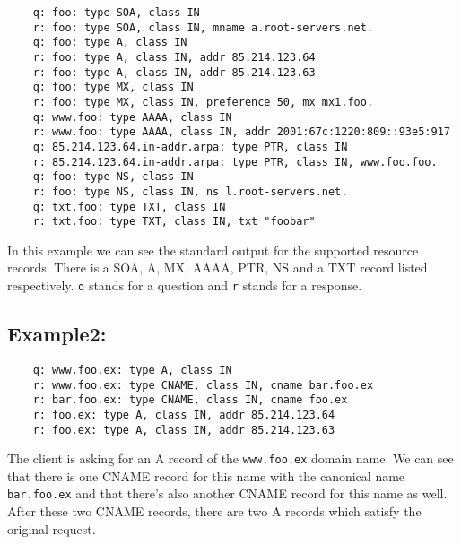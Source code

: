 \documentclass[12pt,a4paper,titlepage,final]{article}
\begin{document}
\begin{verbatim}
	q: foo: type SOA, class IN
	r: foo: type SOA, class IN, mname a.root-servers.net.
	q: foo: type A, class IN
	r: foo: type A, class IN, addr 85.214.123.64
	r: foo: type A, class IN, addr 85.214.123.63
	q: foo: type MX, class IN
	r: foo: type MX, class IN, preference 50, mx mx1.foo.
	q: www.foo: type AAAA, class IN
	r: www.foo: type AAAA, class IN, addr 2001:67c:1220:809::93e5:917
	q: 85.214.123.64.in-addr.arpa: type PTR, class IN
	r: 85.214.123.64.in-addr.arpa: type PTR, class IN, www.foo.foo.
	q: foo: type NS, class IN
	r: foo: type NS, class IN, ns l.root-servers.net.
	q: txt.foo: type TXT, class IN
	r: txt.foo: type TXT, class IN, txt "foobar"
\end{verbatim}
In this example we can see the standard output for the supported resource
records. There is a SOA, A, MX, AAAA, PTR, NS and a TXT record listed
respectively. \texttt{q} stands for a question and \texttt{r} stands for a
response.

\subsection{Example2:} \label{subsec:ex2}

\begin{verbatim}
	q: www.foo.ex: type A, class IN
	r: www.foo.ex: type CNAME, class IN, cname bar.foo.ex
	r: bar.foo.ex: type CNAME, class IN, cname foo.ex
	r: foo.ex: type A, class IN, addr 85.214.123.64
	r: foo.ex: type A, class IN, addr 85.214.123.63
\end{verbatim}
The client is asking for an A record of the \texttt{www.foo.ex} domain name. We
can see that there is one CNAME record for this name with the canonical name
\texttt{bar.foo.ex} and that there's also another CNAME record for this name as
well. After these two CNAME records, there are two A records which satisfy the
original request.

\newpage



\begin{flushleft}
	
\end{flushleft}
\end{document}
